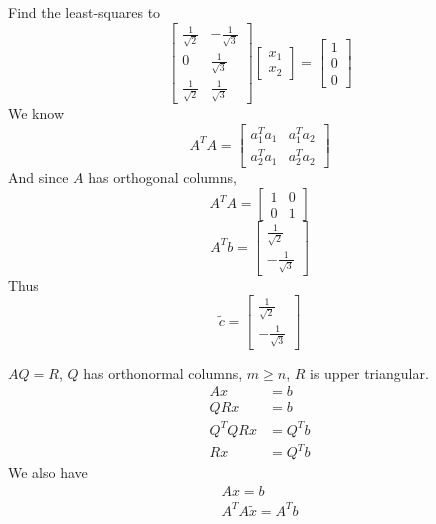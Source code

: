 \documentclass[11pt]{article}
\begin{document}
\begin{example}
    Find the least-squares to 
    \[
        \begin{bmatrix}
            \frac{1}{\sqrt{2}} & -\frac{1}{\sqrt{3}}\\
            0 & \frac{1}{\sqrt{3}}\\
            \frac{1}{\sqrt{2}} & \frac{1}{\sqrt{3}}
        \end{bmatrix}
        \begin{bmatrix}
            x_1 \\ x_2
        \end{bmatrix}
        =
        \begin{bmatrix}
            1\\0\\0
        \end{bmatrix}
    \]
    We know
    \[
        A^TA = \begin{bmatrix}
            a_1^Ta_1 & a_1^T a_2\\
            a_2^T a_1 & a_2^T a_2
        \end{bmatrix}
    \]
    And since $A$ has orthogonal columns,
    \[
        A^T A = \begin{bmatrix}
            1 & 0 \\
            0 & 1
        \end{bmatrix}
    \]
    \[
        A^Tb = \begin{bmatrix}
            \frac{1}{\sqrt{2}} \\ -\frac{1}{\sqrt{3}}
        \end{bmatrix}
    \]
    Thus
    \[
    \tilde{c} =     
    \begin{bmatrix}
            \frac{1}{\sqrt{2}} \\ -\frac{1}{\sqrt{3}}
        \end{bmatrix}
    \]
    
\end{example}
\begin{example}
    $AQ=R$, $Q$ has orthonormal columns, $m \ge n$, $R$ is upper triangular.
    \begin{align*}
        Ax&=b\\
        QRx&=b\\
        Q^TQRx&=Q^Tb\\
        Rx&=Q^Tb
    \end{align*}
    We also have
    \begin{align*}
        Ax=b\\
        A^TA\tilde{x} = A^Tb
    \end{align*}
\end{example}
\end{document}
